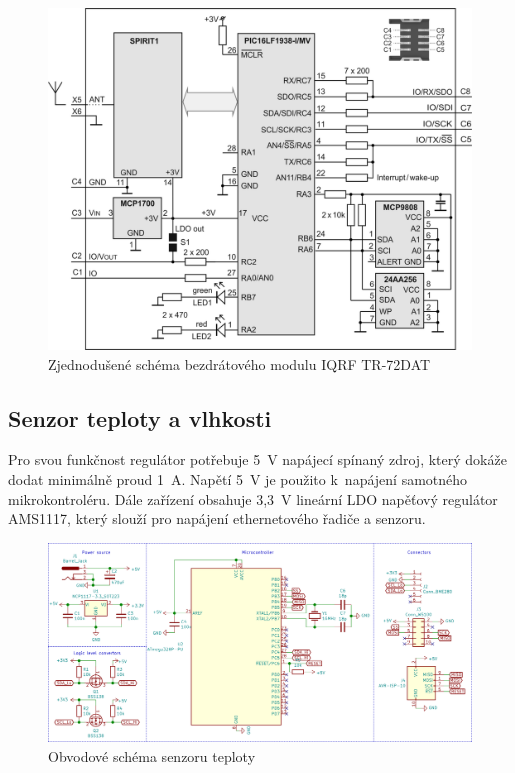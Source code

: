 \documentclass[12pt,a4paper]{article}
\begin{document}
\begin{figure}[H]
\centering
\label{fig:iqrf/zjednodusene-schema}
\includegraphics[width = 128mm]{img/iqrf/dctr-72dat-zjednodusene-schema.png}
\caption{Zjednodušené schéma bezdrátového modulu IQRF TR-72DAT}
\end{figure}

\newpage

\subsection{Senzor teploty a vlhkosti}

Pro svou funkčnost regulátor potřebuje 5~V napájecí spínaný zdroj, který dokáže dodat minimálně proud 1~A. Napětí 5~V je použito k~napájení samotného mikrokontroléru. Dále zařízení obsahuje 3,3~V lineární LDO napěťový regulátor AMS1117, který slouží pro napájení ethernetového řadiče a senzoru.

\begin{figure}[H]
\centering
\label{fig:schematic/sensor}
\includegraphics[width = 150mm]{img/kicad/sensor-schema.png}
\caption{Obvodové schéma senzoru teploty}
\end{figure}
\end{document}
